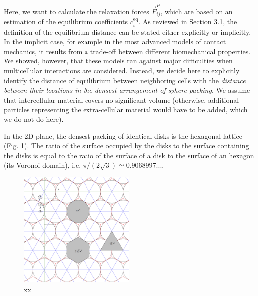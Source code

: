 Here, we want to calculate the relaxation forces $\vec{F}^P_{ij}$, which are based on an estimation of the equilibrium coefficients $c^{\mathrm{eq}}_i$. As reviewed in Section 3.1, the definition of the equilibrium distance can be stated either explicitly or implicitly. In the implicit case, for example in the most advanced models of contact mechanics, it results from a trade-off between different biomechanical properties. We showed, however, that these models ran against major difficulties when multicellular interactions are considered. Instead, we decide here to explicitly identify the distance of equilibrium between neighboring cells with the \textit{distance between their locations in the densest arrangement of sphere packing}. We assume that intercellular material covers no significant volume (otherwise, additional particles representing the extra-cellular material would have to be added, which we do not do here).

In the 2D plane, the densest packing of identical disks is the hexagonal lattice (Fig. \ref{spatial_neighb_hexagonal_compact}). The ratio of the surface occupied by the disks to the surface containing the disks is equal to the ratio of the surface of a disk to the surface of an hexagon (its Voronoi domain), i.e. $\pi/(2\sqrt{3}) \simeq 0.9068997...$.
\begin{figure}
\begin{center}
\includegraphics[width=0.5\textwidth]{../../images/MECAGEN/spatial_neighb/hexagonal_compact.png}
\end{center}
\caption{xx}
\label{spatial_neighb_hexagonal_compact}
\end{figure}


